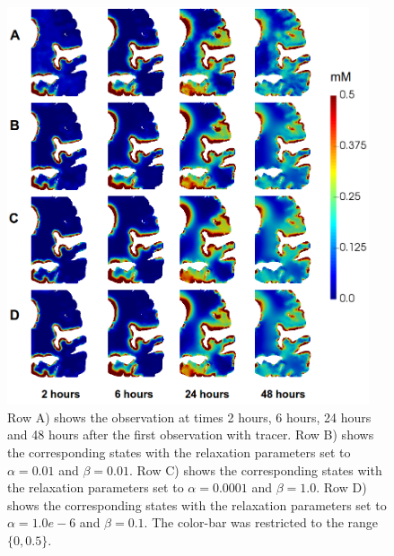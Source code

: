\documentclass[11pt,a4paper]{article}
\begin{document}




\newpage 
{}




 
 
 



 
\begin{figure}
\centering
\includegraphics[width=0.95\textwidth]{different.png} 
\caption{Row A) shows the observation at times 2 hours, 6 hours, 24 hours and 48 hours after the first observation with tracer. Row B) shows the corresponding states with the relaxation parameters set to $ \alpha=0.01$ and $\beta=0.01$.   Row C) shows the corresponding states with the relaxation parameters set to $ \alpha=0.0001$ and $\beta=1.0$.
 Row D) shows the corresponding states with the relaxation parameters set to$ \alpha=1.0e-6$ and $\beta=0.1$. The color-bar was restricted to the range $ \lbrace 0 ,0.5 \rbrace$. }
\label{Fig::realdata}
\end{figure}
\end{document}
